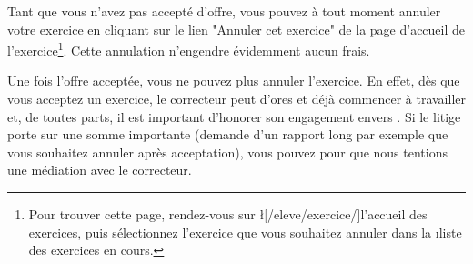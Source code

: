 ﻿Tant que vous n'avez pas accepté d'offre, vous pouvez à tout moment annuler votre exercice en cliquant sur le lien "Annuler cet exercice" de la page d'accueil de l'exercice\footnote{Pour trouver cette page, rendez-vous sur \l[/eleve/exercice/]{l'accueil des exercices}, puis sélectionnez l'exercice que vous souhaitez annuler dans la \i{liste des exercices en cours}.}. Cette annulation n'engendre évidemment aucun frais.

Une fois l'offre acceptée, vous ne pouvez plus annuler l'exercice. En effet, dès que vous acceptez un exercice, le correcteur peut d'ores et déjà commencer à travailler et, de toutes parts, il est important d'honorer son engagement envers \eDevoir.
Si le litige porte sur une somme importante (demande d'un rapport long par exemple que vous souhaitez annuler après acceptation), vous pouvez  pour que nous tentions une médiation avec le correcteur.